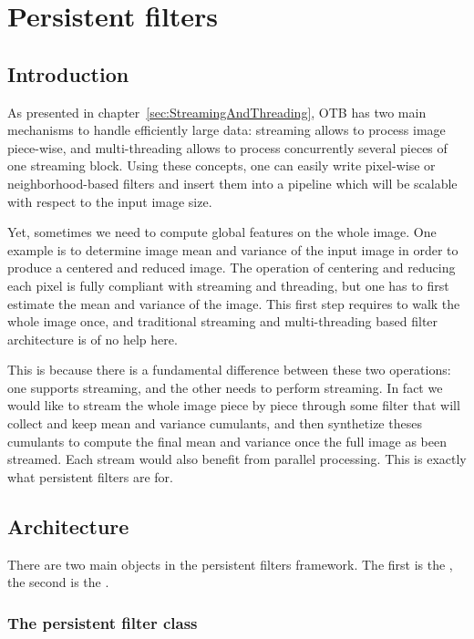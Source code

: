 \chapter{Persistent filters}
\label{chapter:PersistentFilters}

\section{Introduction}

As presented in chapter~\ref{sec:StreamingAndThreading}, OTB has two
main mechanisms to handle efficiently large data: streaming allows to
process image piece-wise, and multi-threading allows to process
concurrently several pieces of one streaming block. Using these
concepts, one can easily write pixel-wise or neighborhood-based
filters and insert them into a pipeline which will be scalable with
respect to the input image size.

Yet, sometimes we need to compute global features on the whole image. One
example is to determine image mean and variance of the input image in
order to produce a centered and reduced image. The operation of
centering and reducing each pixel is fully compliant with streaming and
threading, but one has to first estimate the mean and variance of the
image. This first step requires to walk the whole image once, and
traditional streaming and multi-threading based filter architecture is
of no help here. 

This is because there is a fundamental difference between these two
operations: one supports streaming, and the other needs to perform
streaming. In fact we would like to stream the whole image piece by
piece through some filter that will collect and keep mean and variance
cumulants, and then synthetize theses cumulants to compute the final
mean and variance once the full image as been streamed. Each
stream would also benefit from parallel processing. This is exactly
what persistent filters are for.

\section{Architecture}

There are two main objects in the persistent filters framework. The
first is the , the second is the
.

\subsection{The persistent filter class}

